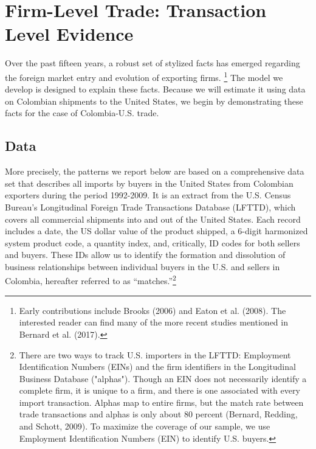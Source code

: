 \documentclass[12pt]{article}
\begin{document}
\section{Firm-Level Trade: Transaction Level Evidence}

Over the past fifteen years, a robust set of stylized facts has emerged
regarding the foreign market entry and evolution of exporting firms.%
\footnote{%
Early contributions include Brooks (2006) and Eaton et al. (2008). The
interested reader can find many of the more recent studies mentioned in
Bernard et al. (2017). } The model we develop is designed to explain these
facts. Because we will estimate it using data on Colombian shipments to the
United States, we begin by demonstrating these facts for the case of
Colombia-U.S. trade. \label{sec:data}

\subsection{Data}

More precisely, the patterns we report below are based on a comprehensive
data set that describes all imports by buyers in the United States from
Colombian exporters during the period 1992-2009. It is an extract from the
U.S. Census Bureau's Longitudinal Foreign Trade Transactions Database
(LFTTD), which covers all commercial shipments into and out of the United
States. Each record includes a date, the US dollar value of the product
shipped, a 6-digit harmonized system product code, a quantity index, and,
critically, ID codes for both sellers and buyers. These IDs allow us to
identify the formation and dissolution of business relationships between
individual buyers in the U.S. and sellers in Colombia, hereafter referred to
as \textquotedblleft matches.\textquotedblright \footnote{%
There are two ways to track U.S. importers in the LFTTD: Employment
Identification Numbers (EINs) and the firm identifiers in the Longitudinal
Business Database ("alphas"). Though an EIN does not necessarily identify a
complete firm, it is unique to a firm, and there is one associated with
every import transaction. Alphas map to entire firms, but the match rate
between trade transactions and alphas is only about 80 percent (Bernard,
Redding, and Schott, 2009). To maximize the coverage of our sample, we use
Employment Identification Numbers (EIN) to identify U.S. buyers.\medskip }\ 
\end{document}
